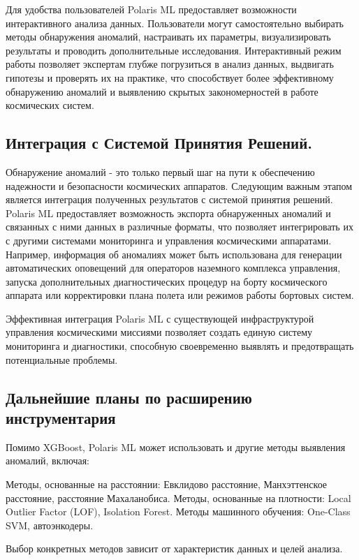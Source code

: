 \documentclass[14pt, a4paper]{extreport}
\begin{document}
    Для удобства пользователей Polaris ML предоставляет возможности интерактивного анализа данных.
    Пользователи могут самостоятельно выбирать методы обнаружения аномалий, настраивать их параметры, визуализировать результаты и проводить дополнительные исследования.
    Интерактивный режим работы позволяет экспертам глубже погрузиться в анализ данных, выдвигать гипотезы и проверять их на практике, что способствует более эффективному обнаружению аномалий и выявлению скрытых закономерностей в работе космических систем.

    \subsection{Интеграция с Системой Принятия Решений.}

    Обнаружение аномалий - это только первый шаг на пути к обеспечению надежности и безопасности космических аппаратов.
    Следующим важным этапом является интеграция полученных результатов с системой принятия решений.
    Polaris ML предоставляет возможность экспорта обнаруженных аномалий и связанных с ними данных в различные форматы, что позволяет интегрировать их с другими системами мониторинга и управления космическими аппаратами.
    Например, информация об аномалиях может быть использована для генерации автоматических оповещений для операторов наземного комплекса управления,
    запуска дополнительных диагностических процедур на борту космического аппарата или корректировки плана полета или режимов работы бортовых систем.

    Эффективная интеграция Polaris ML с существующей инфраструктурой управления космическими миссиями позволяет создать единую систему мониторинга и диагностики, способную своевременно выявлять и предотвращать потенциальные проблемы.

    \subsection{Дальнейшие планы по расширению инструментария}

    Помимо XGBoost, Polaris ML может использовать и другие методы выявления аномалий, включая:

    Методы, основанные на расстоянии: Евклидово расстояние, Манхэттенское расстояние, расстояние Махаланобиса.
    Методы, основанные на плотности: Local Outlier Factor (LOF), Isolation Forest.
    Методы машинного обучения: One-Class SVM, автоэнкодеры.

    Выбор конкретных методов зависит от характеристик данных и целей анализа.
\end{document}
